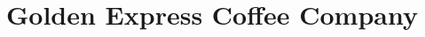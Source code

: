 \documentclass[
  phd,
  american
]{Iserj}
\title{Golden Express Coffee Company}
\begin{document}
%  
  
  
  
  
  
  \arial
  
  \normalfont
  
\end{document}
